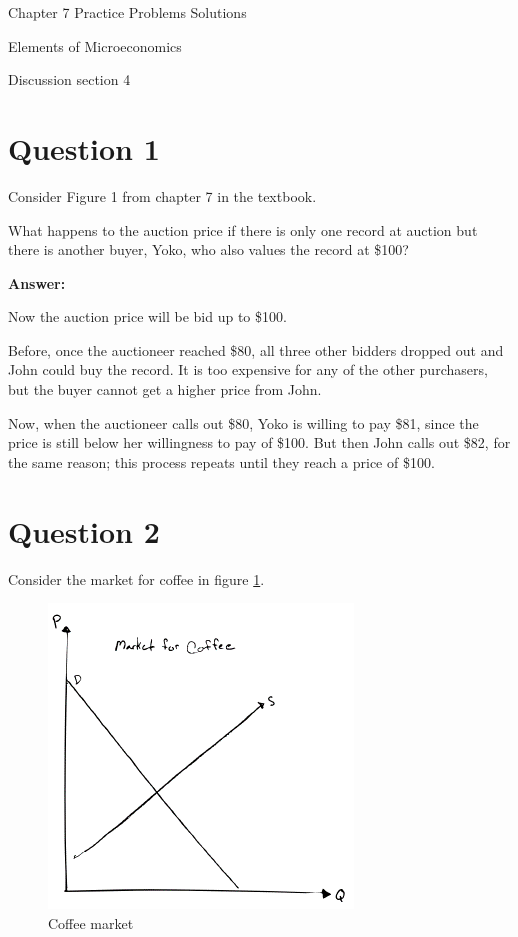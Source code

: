\documentclass[12pt]{article}
\begin{document}
\begin{center}
\Large Chapter 7 Practice Problems Solutions

\medskip

\normalsize Elements of Microeconomics

\medskip

\small Discussion section 4
\end{center}

\medskip

\section*{Question 1}
Consider Figure 1 from chapter 7 in the textbook.

\vspace{2mm}

What happens to the auction price if there is only one record at auction but there is another buyer, Yoko, who also values the record at \$100?

\vspace{2mm}

\textbf{Answer:}

\vspace{2mm}

Now the auction price will be bid up to \$100.

\vspace{2mm}

Before, once the auctioneer reached \$80, all three other bidders dropped out and John could buy the record. It is too expensive for any of the other purchasers, but the buyer cannot get a higher price from John.

\vspace{2mm}

Now, when the auctioneer calls out \$80, Yoko is willing to pay \$81, since the price is still below her willingness to pay of \$100. But then John calls out \$82, for the same reason; this process repeats until they reach a price of \$100.

\section*{Question 2}
Consider the market for coffee in figure \ref{fig:coffee1}.

\begin{figure}
    \centering
    \includegraphics[width=.5\textwidth]{../../figs/coffee1.png}
    \caption{Coffee market}
    \label{fig:coffee1}
\end{figure}
\end{document}
